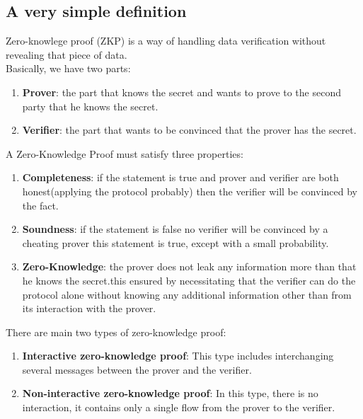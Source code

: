 \documentclass[12pt,a4paper]{article}
\begin{document}
\subsection{A very simple definition}
Zero-knowlege proof (ZKP) is a way of handling data verification without revealing that piece of data.\\
Basically, we have two parts:
\begin{enumerate}	
	\item
	\begin{enumerate}
\textbf{Prover}: the part that knows the secret and wants to prove to the second party that he knows the secret.
\end{enumerate}	
\item
\begin{enumerate}
 \textbf{Verifier}: the part that wants to be convinced that the prover has the secret.
\end{enumerate}	
\end{enumerate}	
A Zero-Knowledge Proof must satisfy three properties:\cite{101block:2}
\begin{enumerate}	
\item
\begin{enumerate}
\textbf{Completeness}: if the statement is true and prover and verifier are both honest(applying the protocol probably) then the verifier will be convinced by the fact.
\end{enumerate}	
\item
\begin{enumerate}
\textbf{Soundness}: if the statement is false no verifier will be convinced by a cheating prover this statement is true, except with a small probability.

\end{enumerate}	
\item
\begin{enumerate}
\textbf{Zero-Knowledge}: the prover does not leak any information more than that he knows the secret.this ensured by necessitating that the verifier can do the protocol alone without knowing any additional information other than from its interaction with the prover.
\end{enumerate}	
\end{enumerate}	
There are main two types of zero-knowledge proof:\cite{couteau2017zero:4}
\begin{enumerate}	
	\item
	\begin{enumerate}
		\textbf{Interactive zero-knowledge proof}: This type includes interchanging several messages between the prover and the verifier.
	\end{enumerate}
	\item
	\begin{enumerate}
		\textbf{Non-interactive zero-knowledge proof}: In this type, there is no interaction, it contains only a single flow from the prover to the verifier.
	\end{enumerate}
\end{enumerate}
\end{document}
